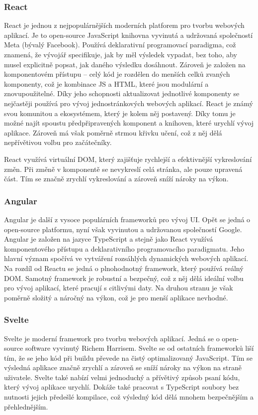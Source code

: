 \subsubsection*{React}
React je jednou z nejpopulárnějších moderních platforem pro tvorbu webových aplikací. Je to open-source JavaScript knihovna vyvinutá a udržovaná společností Meta (bývalý Facebook). Používá deklarativní programovací paradigma, což znamená, že vývojář specifikuje, jak by měl výsledek vypadat, bez toho, aby musel explicitně popsat, jak daného výsledku dosáhnout. Zároveň je založen na komponentovém přístupu -- celý kód je rozdělen do menších celků zvaných komponenty, což je kombinace JS a HTML, které jsou modulární a znovupoužitelné. Díky jeho schopnosti aktualizovat jednotlivé komponenty se nejčastěji používá pro vývoj jednostránkových webových aplikací. React je známý svou komunitou a ekosystémem, který je kolem něj postavený. Díky tomu je možné najít spoustu předpřipravených komponent a knihoven, které urychlí vývoj aplikace. Zároveň má však poměrně strmou křivku učení, což z něj dělá nepřívětivou volbu pro začátečníky.

React využívá virtuální DOM, který zajišťuje rychlejší a efektivnější vykreslování změn. Při změně v komponentě se nevykreslí celá stránka, ale pouze upravená část. Tím se značně zrychlí vykreslování a zároveň sníží nároky na výkon.\cite{react, what_react_is_and_why_it_matters,angular_vs_react}

\subsubsection*{Angular}
Angular je další z vysoce populárních frameworků pro vývoj UI. Opět se jedná o open-source platformu, nyní však vyvinutou a udržovanou společností Google. Angular je založen na jazyce TypeScript a stejně jako React využívá komponentového přístupu a deklarativního programovacího paradigmatu. Jeho hlavní význam spočívá ve vytváření rozsáhlých dynamických webových aplikací. Na rozdíl od Reactu se jedná o plnohodnotný framework, který používá reálný DOM. Samotný framework je robustní a bezpečný, což z něj dělá ideální volbu pro vývoj aplikací, které pracují s citlivými daty. Na druhou stranu je však poměrně složitý a náročný na výkon, což je pro menší aplikace nevhodné.\cite{what_is_angular,angular_vs_react}

\subsubsection*{Svelte}
Svelte je moderní framework pro tvorbu webových aplikací. Jedná se o open-source software vyvinutý Richem Harrisem. Svelte se od ostatních frameworků liší tím, že se jeho kód při buildu převede na čistý optimalizovaný JavaScript. Tím se výsledná aplikace značně zrychlí a zároveň se sníží nároky na výkon na straně uživatele. Svelte také nabízí velmi jednoduchý a přívětivý způsob psaní kódu, který vývoj aplikace urychlí. Dokáže také pracovat s TypeScript soubory bez nutnosti jejich předešlé kompilace, což výsledný kód dělá mnohem bezpečnějším a přehlednějším.\cite{svelte_and_why_you_should_consider_it,svelte}

